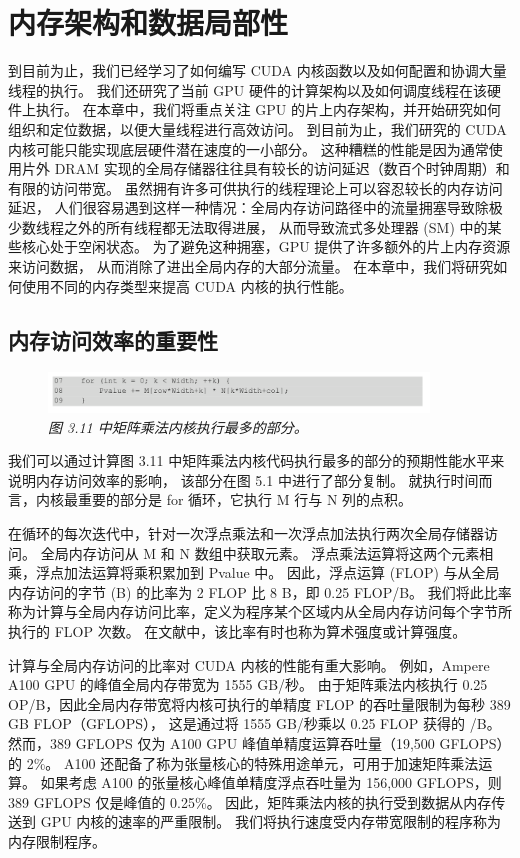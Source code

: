 \section{内存架构和数据局部性}
到目前为止，我们已经学习了如何编写 CUDA 内核函数以及如何配置和协调大量线程的执行。 
我们还研究了当前 GPU 硬件的计算架构以及如何调度线程在该硬件上执行。 
在本章中，我们将重点关注 GPU 的片上内存架构，并开始研究如何组织和定位数据，以便大量线程进行高效访问。 
到目前为止，我们研究的 CUDA 内核可能只能实现底层硬件潜在速度的一小部分。 
这种糟糕的性能是因为通常使用片外 DRAM 实现的全局存储器往往具有较长的访问延迟（数百个时钟周期）和有限的访问带宽。 
虽然拥有许多可供执行的线程理论上可以容忍较长的内存访问延迟，
人们很容易遇到这样一种情况：全局内存访问路径中的流量拥塞导致除极少数线程之外的所有线程都无法取得进展，
从而导致流式多处理器 (SM) 中的某些核心处于空闲状态。 为了避免这种拥塞，GPU 提供了许多额外的片上内存资源来访问数据，
从而消除了进出全局内存的大部分流量。 在本章中，我们将研究如何使用不同的内存类型来提高 CUDA 内核的执行性能。

\subsection{内存访问效率的重要性}
\begin{figure}[H]
	\centering
	\includegraphics[width=0.9\textwidth]{figs/F5.1.png}
	\caption{\textit{图 3.11 中矩阵乘法内核执行最多的部分。}}
\end{figure}

我们可以通过计算图 3.11 中矩阵乘法内核代码执行最多的部分的预期性能水平来说明内存访问效率的影响，
该部分在图 5.1 中进行了部分复制。 就执行时间而言，内核最重要的部分是 for 循环，它执行 M 行与 N 列的点积。

在循环的每次迭代中，针对一次浮点乘法和一次浮点加法执行两次全局存储器访问。 全局内存访问从 M 和 N 数组中获取元素。 
浮点乘法运算将这两个元素相乘，浮点加法运算将乘积累加到 Pvalue 中。 
因此，浮点运算 (FLOP) 与从全局内存访问的字节 (B) 的比率为 2 FLOP 比 8 B，即 0.25 FLOP/B。 
我们将此比率称为计算与全局内存访问比率，定义为程序某个区域内从全局内存访问每个字节所执行的 FLOP 次数。 
在文献中，该比率有时也称为算术强度或计算强度。

计算与全局内存访问的比率对 CUDA 内核的性能有重大影响。 例如，Ampere A100 GPU 的峰值全局内存带宽为 1555 GB/秒。 
由于矩阵乘法内核执行 0.25 OP/B，因此全局内存带宽将内核可执行的单精度 FLOP 的吞吐量限制为每秒 389 GB FLOP（GFLOPS），
这是通过将 1555 GB/秒乘以 0.25 FLOP 获得的 /B。 
然而，389 GFLOPS 仅为 A100 GPU 峰值单精度运算吞吐量（19,500 GFLOPS）的 2\%。 
A100 还配备了称为张量核心的特殊用途单元，可用于加速矩阵乘法运算。 
如果考虑 A100 的张量核心峰值单精度浮点吞吐量为 156,000 GFLOPS，则 389 GFLOPS 仅是峰值的 0.25\%。 
因此，矩阵乘法内核的执行受到数据从内存传送到 GPU 内核的速率的严重限制。 
我们将执行速度受内存带宽限制的程序称为内存限制程序。

